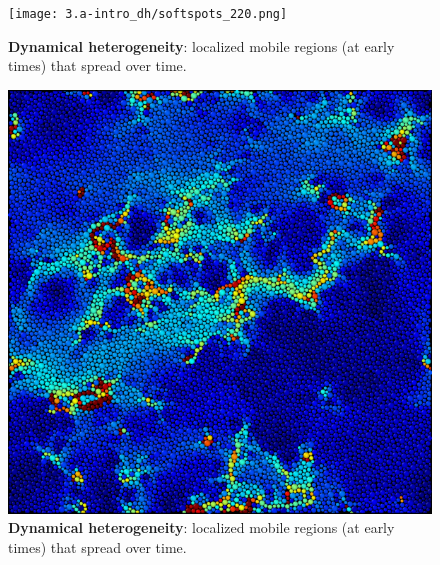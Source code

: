 \begin{frame}[c]
\begin{columns}
\begin{column}{0.5\textwidth}
\begin{figure}[t]
\begin{overprint}
\centering\texttt{[image: 3.a-intro\_dh/softspots\_220.png]}
\caption{\textbf{Dynamical heterogeneity}: localized mobile regions (at early times) that spread over time.}  

\centering\includegraphics[height=0.6\textheight]{intro_glassy/softspots_280.png}
\caption{\textbf{Dynamical heterogeneity}: localized mobile regions (at early times) that spread over time.}  
\end{overprint}

\end{figure}






\end{column}
\end{columns}
\end{frame}
